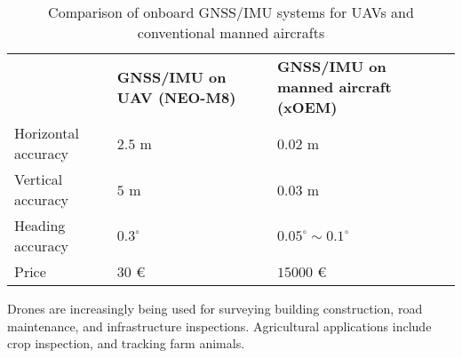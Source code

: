 \begin{table}[H]
  \begin{center}
  \small
  \begin{tabular}{@{}p{.23\linewidth}p{.25\linewidth}p{.4\linewidth}@{}}
    \toprule
    {} & {\textbf{GNSS/IMU on UAV (NEO-M8)}} & {\textbf{GNSS/IMU on manned aircraft (xOEM)}} \\
    \cmidrule(){1-3}
    Horizontal accuracy & $2.5$ m & $0.02$ m \\
    \midrule
    Vertical accuracy & $5$ m & $0.03$ m \\
    \midrule
Heading accuracy& $0.3^{\circ}$  & $0.05^{\circ}\sim0.1^{\circ}$\\
    \midrule
    Price & $30$ \euro{} & $15000$ \euro{}\\ 
    \bottomrule
  \end{tabular}
  \end{center}
  \caption {Comparison of onboard GNSS/IMU systems for UAVs and conventional manned aircrafts}
\label{tab:comp_acc}
\end{table}

Drones are increasingly being used for surveying building construction, road maintenance, and infrastructure inspections. Agricultural applications include crop inspection, and tracking farm animals. 